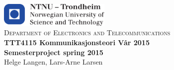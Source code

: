 \begin{titlepage}

	\begin{center}~
		\\[5cm]

		\includegraphics[width=0.4\textwidth]{./img/logontnu}~
		\\[0.3cm]
		\textsc{ Department of Electronics and Telecommunications}~
		\\[2cm]

		{ \huge \bfseries TTT4115 Kommunikasjonsteori Vår 2015 \\[0.5cm]
		Semesterproject spring 2015 }~
		\\[1.5cm]
		

		{ \LARGE Helge Langen, Lars-Arne Larsen}
	\end{center}


\end{titlepage}
